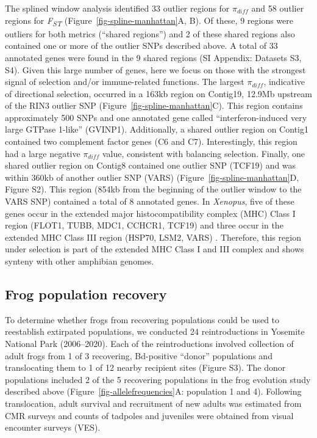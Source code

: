 \documentclass[9pt,twocolumn,twoside,lineno]{pnas-new}
\begin{document}
The splined window analysis identified 33 outlier regions for
\(\pi_{diff}\) and 58 outlier regions for \emph{F\textsubscript{ST}}
(Figure~\ref{fig-spline-manhattan}A, B). Of these, 9 regions were
outliers for both metrics (``shared regions'') and 2 of these shared
regions also contained one or more of the outlier SNPs described above.
A total of 33 annotated genes were found in the 9 shared regions (SI
Appendix: Datasets S3, S4). Given this large number of genes, here we
focus on those with the strongest signal of selection and/or
immune-related functions. The largest \(\pi_{diff}\), indicative of
directional selection, occurred in a 163kb region on Contig19, 12.9Mb
upstream of the RIN3 outlier SNP (Figure~\ref{fig-spline-manhattan}C).
This region contains approximately 500 SNPs and one annotated gene
called ``interferon-induced very large GTPase 1-like'' (GVINP1).
Additionally, a shared outlier region on Contig1 contained two
complement factor genes (C6 and C7). Interestingly, this region had a
large negative \(\pi_{diff}\) value, consistent with balancing
selection. Finally, one shared outlier region on Contig8 contained one
outlier SNP (TCF19) and was within 360kb of another outlier SNP (VARS)
(Figure~\ref{fig-spline-manhattan}D, Figure S2).
This region (854kb from the beginning of the outlier window to the VARS
SNP) contained a total of 8 annotated genes. In \emph{Xenopus}, five of
these genes occur in the extended major histocompatibility complex (MHC)
Class I region (FLOT1, TUBB, MDC1, CCHCR1, TCF19) and three occur in the
extended MHC Class III region (HSP70, LSM2, VARS) \citep{ohta2006}.
Therefore, this region under selection is part of the extended MHC Class
I and III complex and shows synteny with other amphibian genomes.

\subsection*{Frog population recovery}

To determine whether frogs from recovering populations could be used to
reestablish extirpated populations, we conducted 24 reintroductions in
Yosemite National Park (2006--2020). Each of the reintroductions
involved collection of adult frogs from 1 of 3 recovering, Bd-positive
``donor'' populations and translocating them \citep{seddon2014} to 1 of
12 nearby recipient sites (Figure S3). The donor
populations included 2 of the 5 recovering populations in the frog
evolution study described above (Figure~\ref{fig-allelefrequencies}A:
population 1 and 4). Following translocation, adult survival and
recruitment of new adults was estimated from CMR surveys and counts of
tadpoles and juveniles were obtained from visual encounter surveys
(VES).
\end{document}
